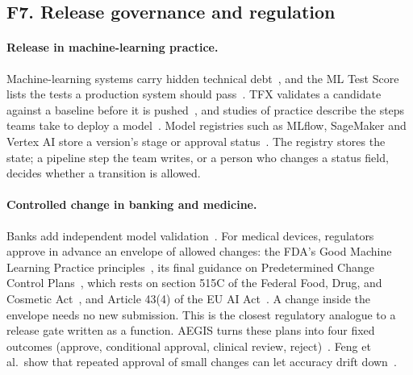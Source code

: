 \subsection{F7. Release governance and regulation}
\label{sec:survey-reg}

\paragraph{Release in machine-learning practice.} Machine-learning systems carry
hidden technical debt~\citep{sculley2015hidden}, and the ML Test Score lists the
tests a production system should pass~\citep{breck2017ml}. TFX validates a
candidate against a baseline before it is pushed~\citep{baylor2017tfx}, and
studies of practice describe the steps teams take to deploy a
model~\citep{amershi2019software,paleyes2022challenges,kreuzberger2023machine,shankar2024we}.
Model registries such as MLflow, SageMaker and Vertex AI store a version's stage
or approval status~\citep{zaharia2018accelerating,mlflow2026registry,aws2026sagemakerapproval,google2026vertexalias}.
The registry stores the state; a pipeline step the team writes, or a person who
changes a status field, decides whether a transition is allowed.

\paragraph{Controlled change in banking and medicine.} Banks add independent
model validation~\citep{fed2011sr117,pra2023ss123}. For medical devices,
regulators approve in advance an envelope of allowed changes: the FDA's Good
Machine Learning Practice principles~\citep{fda2021gmlp}, its final guidance on
Predetermined Change Control Plans~\citep{fda2024pccp,fda2023pccpprinciples},
which rests on section 515C of the Federal Food, Drug, and Cosmetic
Act~\citep{usc2022pccp}, and Article 43(4) of the EU AI
Act~\citep{eu2024aiact}. A change inside the envelope needs no new submission.
This is the closest regulatory analogue to a release gate written as a function.
AEGIS turns these plans into four fixed outcomes (approve, conditional approval,
clinical review, reject)~\citep{afdideh2026aegis}. Feng et al.\ show that
repeated approval of small changes can let accuracy drift
down~\citep{feng2021approval}.

